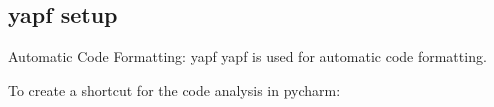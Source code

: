 


\subsection{yapf setup}
Automatic Code Formatting: yapf
yapf is used for automatic code formatting.

To create a shortcut for the code analysis in pycharm:

